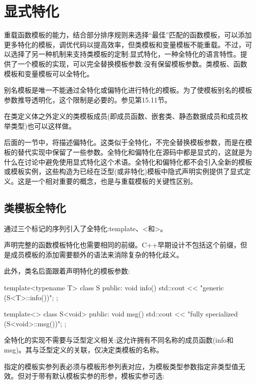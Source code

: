 \section{显式特化}

重载函数模板的能力，结合部分排序规则来选择“最佳”匹配的函数模板，可以添加更多特化的模板，调优代码以提高效率，但类模板和变量模板不能重载。不过，可以选择了另一种机制来支持类模板的定制:显式特化，一种全特化的语言特性。提供了一个模板的实现，可以完全替换模板参数:没有保留模板参数。类模板、函数模板和变量模板可以全特化。

\begin{notice}
别名模板是唯一不能通过全特化或偏特化进行特化的模板。为了使模板别名的模板参数推导透明化，这个限制是必要的。参见第15.11节。
\end{notice}

在类定义体之外定义的类模板成员(即成员函数、嵌套类、静态数据成员和成员枚举类型)也可以这样做。

后面的一节中，将描述偏特化。这类似于全特化，不完全替换模板参数，而是在模板的替代实现中保留了一些参数。全特化和偏特化在源码中都是显式的，这就是为什么在讨论中避免使用显式特化这个术语。全特化和偏特化都不会引入全新的模板或模板实例，这些构造为已经在泛型(或非特化)模板中隐式声明实例提供了显式定义。这是一个相对重要的概念，也是与重载模板的关键性区别。

\subsection{类模板全特化}

通过三个标记的序列引入了全特化:template、<和>。

\begin{notice}
声明完整的函数模板特化也需要相同的前缀。C++早期设计不包括这个前缀，但是成员模板的添加需要额外的语法来消除复杂的特化歧义。
\end{notice}

此外，类名后面跟着声明特化的模板参数:

\begin{cpp}
template<typename T>
class S {
	public:
	void info() {
		std::cout << "generic (S<T>::info())\n";
	}
};

template<>
class S<void> {
	public:
	void msg() {
		std::cout << "fully specialized (S<void>::msg())\n";
	}
};
\end{cpp}

全特化的实现不需要与泛型定义相关:这允许拥有不同名称的成员函数(info和msg)。其与泛型定义的关联，仅决定类模板的名称。

指定的模板实参列表必须与模板形参列表对应，为模板类型参数指定非类型值无效。但对于带有默认模板实参的形参，模板实参可选:

